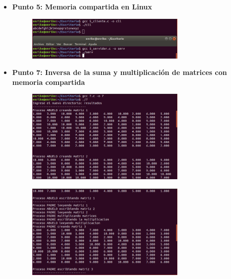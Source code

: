 \documentclass[12pt]{article}
\begin{document}
\begin{itemize}
\begin{figure}[h!]
          \end{figure}

            \item[\Checkmark] \textbf{Punto 5: Memoria compartida en Linux} 
                \begin{figure}[h!]
                        \centering
                       \includegraphics[width=0.73\textwidth]{Practica6/Images/Linux/5.png}
                \end{figure}

            \item[\Checkmark] \textbf{Punto 7: Inversa de la suma y multiplicación de matrices con memoria compartida} 
                 \begin{figure}[h!]
                        \centering
                       \includegraphics[width=0.73\textwidth]{Practica6/Images/Linux/7_1.png}
                \end{figure}
                \begin{figure}[h!]
                        \centering
                       \includegraphics[width=0.73\textwidth]{Practica6/Images/Linux/7_2.png}
                       

\end{figure}
\end{itemize}
\end{document}
